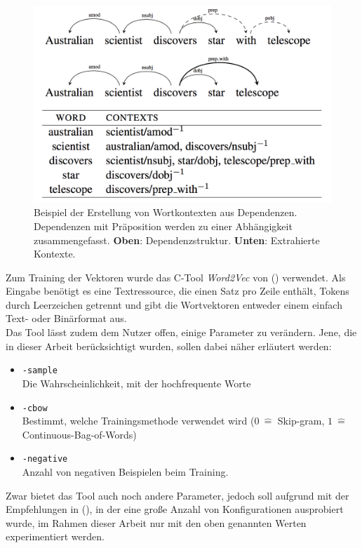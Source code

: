   \begin{figure}[h]
      \centering
      \includegraphics[scale=0.2]{../img/depend_ex.png}
      \caption[Erstellung von Dependenzkontexten beim Wortvektortraining]{Beispiel der Erstellung von Wortkontexten aus Dependenzen.
      Dependenzen mit Präposition werden zu einer Abhängigkeit zusammengefasst. \textbf{Oben}: Dependenzstruktur.
      \textbf{Unten}: Extrahierte Kontexte.}
  \end{figure}

  Zum Training der Vektoren wurde das C-Tool \emph{Word2Vec} von (\citeauthor{mikolov2013efficient}) verwendet. Als Eingabe
  benötigt es eine Textressource, die einen Satz pro Zeile enthält, Tokens durch Leerzeichen getrennt und gibt die Wortvektoren
  entweder einem einfach Text- oder Binärformat aus.\\
  Das Tool lässt zudem dem Nutzer offen, einige Parameter zu verändern. Jene, die in dieser Arbeit berücksichtigt wurden, sollen
  dabei näher erläutert werden:
  \begin{itemize}
    \item \verb|-sample|\\Die Wahrscheinlichkeit, mit der hochfrequente Worte
    \item \verb|-cbow|\\Bestimmt, welche Trainingsmethode verwendet wird ($0\ \hat{=}$ Skip-gram, $1\ \hat{=}$ Continuous-Bag-of-Words)
    \item \verb|-negative|\\Anzahl von negativen Beispielen beim Training.
  \end{itemize}

  Zwar bietet das Tool auch noch andere Parameter, jedoch soll aufgrund mit der Empfehlungen in (\citeauthor{levy2015improving}), in
  der eine große Anzahl von Konfigurationen ausprobiert wurde, im Rahmen dieser Arbeit nur mit den oben genannten Werten experimentiert werden.
